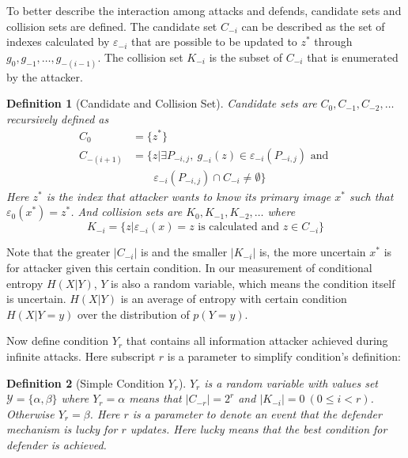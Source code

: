 \documentclass[10pt, conference, compsocconf]{IEEEtran}
\newtheorem{mydef}{Definition}
\begin{document}
        To better describe the interaction among attacks
        and defends, candidate sets and collision sets are defined.
		The candidate set $C_{-i}$ can be described as the set of indexes
        calculated by $\varepsilon_{-i}$ that are possible to be
        updated to $z^*$ through $g_0, g_{-1}, \ldots, g_{-(i-1)}$. The collision set $K_{-i}$ is the
        subset of $C_{-i}$ that is enumerated by the attacker.
        \begin{mydef}[Candidate and Collision Set]
            Candidate sets are $C_0, C_{-1}, C_{-2}, \ldots$ recursively defined as
            \begin{align*}
                C_0 &= \{z^*\}\\
                C_{-(i+1)} &= \{z | \exists P_{-i, j},~
                    g_{-i}(z) \in \varepsilon_{-i}(P_{-i, j}) \text{ and } \\
                    & \;\;\;\;\;\;\; \varepsilon_{-i}(P_{-i, j}) \cap C_{-i} \neq \emptyset \}
            \end{align*}
            Here $z^*$ is the index that attacker wants to know its primary image
            $x^*$ such that $\varepsilon_0(x^*) = z^*$. And collision sets are $K_0, K_{-1}, K_{-2}, \ldots$ where
            \begin{equation*}
                K_{-i} = \{z | \varepsilon_{-i}(x) = z \text{ is calculated and } z \in C_{-i} \}
            \end{equation*}
        \end{mydef}
        
        Note that the greater $|C_{-i}|$ is and the smaller $|K_{-i}|$ is,
        the more uncertain $x^*$ is for attacker given this certain
        condition. In our measurement
        of conditional entropy $H(X|Y)$, $Y$ is also a random variable,
        which means the condition itself is uncertain. $H(X|Y)$ is
        an average of entropy with certain condition $H(X|Y = y)$ 
        over the distribution of $p(Y = y)$.

        Now define condition $Y_r$ that contains all information
        attacker achieved during infinite attacks. Here subscript $r$
        is a parameter to simplify condition's definition:
        \begin{mydef}[Simple Condition $Y_r$]
            $Y_r$ is a random variable with values set
            $\mathcal Y = \{ \alpha, \beta \}$ where
            $Y_r = \alpha$ means that $|C_{-r}| = 2^r$
            and $|K_{-i}| = 0~(0 \leq i < r)$.
            Otherwise $Y_r = \beta$.
            Here $r$ is a parameter to denote an event that
            the defender mechanism is lucky for $r$ updates.
            Here lucky means that the best condition for defender is achieved.
        \end{mydef}
\end{document}
